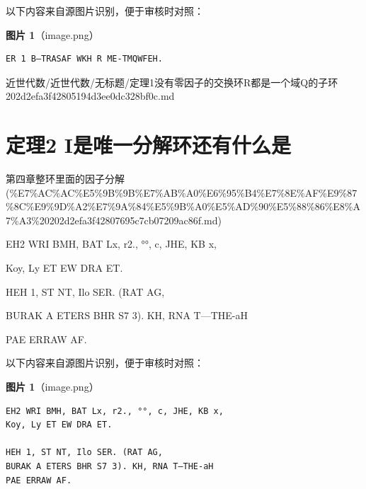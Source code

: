 \begin{note}
以下内容来自源图片识别，便于审核时对照：

\textbf{图片 1}（image.png）
\begin{Verbatim}[fontsize=\small]
ER 1 B—TRASAF WKH R ME-TMQWFEH.
\end{Verbatim}

\end{note}

\begin{note}[来源路径]

近世代数/近世代数/无标题/定理1没有零因子的交换环R都是一个域Q的子环 202d2efa3f42805194d3ee0dc328bf0c.md

\end{note}

\section*{定理2 I是唯一分解环还有什么是}

\begin{note}[来源上级主题]

第四章整环里面的因子分解 (\%E7\%AC\%AC\%E5\%9B\%9B\%E7\%AB\%A0\%E6\%95\%B4\%E7\%8E\%AF\%E9\%87\%8C\%E9\%9D\%A2\%E7\%9A\%84\%E5\%9B\%A0\%E5\%AD\%90\%E5\%88\%86\%E8\%A7\%A3\%20202d2efa3f42807695c7cb07209ac86f.md)

\end{note}

\begin{theorem}[定理2 I是唯一分解环还有什么是]

EH2 WRI BMH, BAT Lx, r2., °°, c, JHE, KB x,

Koy, Ly ET EW DRA ET.

HEH 1, ST NT, Ilo SER. (RAT AG,

BURAK A ETERS BHR S7 3). KH, RNA T—THE-aH

PAE ERRAW AF.

\end{theorem}

\begin{note}
以下内容来自源图片识别，便于审核时对照：

\textbf{图片 1}（image.png）
\begin{Verbatim}[fontsize=\small]
EH2 WRI BMH, BAT Lx, r2., °°, c, JHE, KB x,
Koy, Ly ET EW DRA ET.

HEH 1, ST NT, Ilo SER. (RAT AG,
BURAK A ETERS BHR S7 3). KH, RNA T—THE-aH
PAE ERRAW AF.
\end{Verbatim}

\end{note}


